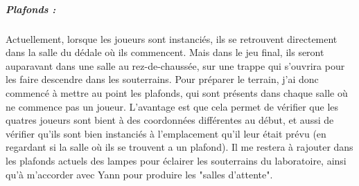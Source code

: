 \documentclass{article}
\begin{document}
\subparagraph{Plafonds :}

Actuellement, lorsque les joueurs sont instanciés, ils se retrouvent directement dans la salle du dédale où ils commencent. Mais dans le jeu final, ils seront auparavant dans une salle au rez-de-chaussée, sur une trappe qui s'ouvrira pour les faire descendre dans les souterrains. Pour préparer le terrain, j'ai donc commencé à mettre au point les plafonds, qui sont présents dans chaque salle où ne commence pas un joueur. L'avantage est que cela permet de vérifier que les quatres joueurs sont bient à des coordonnées différentes au début, et aussi de vérifier qu'ils sont bien instanciés à l'emplacement qu'il leur était prévu (en regardant si la salle où ils se trouvent a un plafond). Il me restera à rajouter dans les plafonds actuels des lampes pour éclairer les souterrains du laboratoire, ainsi qu'à m'accorder avec Yann pour produire les "salles d'attente".

\end{document}
